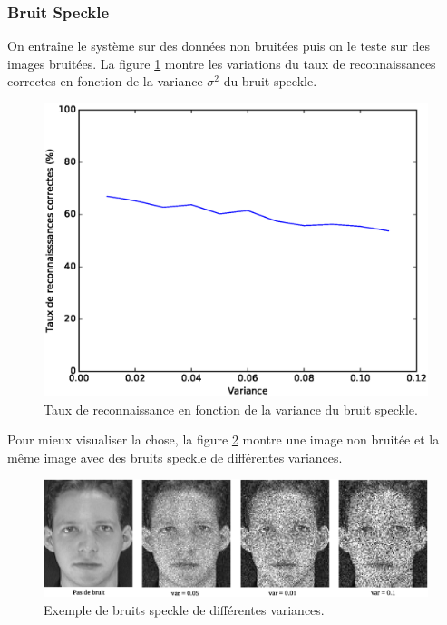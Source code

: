 \subsubsection{Bruit Speckle}
On entraîne le système sur des données non bruitées puis on le teste sur des images
bruitées. La figure \ref{fig:robustness:speckle:test} montre les variations du taux
de reconnaissances correctes en fonction de la variance $\sigma^2$ du bruit speckle.
\begin{figure}[H]
    \centering
    \includegraphics[scale=0.5]{images/robustesse_speckle_test}
    \caption{Taux de reconnaissance en fonction de la variance du bruit speckle.}
    \label{fig:robustness:speckle:test}
\end{figure}
Pour mieux visualiser la chose, la figure \ref{fig:robustness:speckle:exemple} montre
une image non bruitée et la même image avec des bruits speckle de différentes variances.
\begin{figure}[H]
    \centering
    \includegraphics[scale=0.45]{images/robustness_speckle_exemple}
    \caption{Exemple de bruits speckle de différentes variances.}
    \label{fig:robustness:speckle:exemple}
\end{figure}

